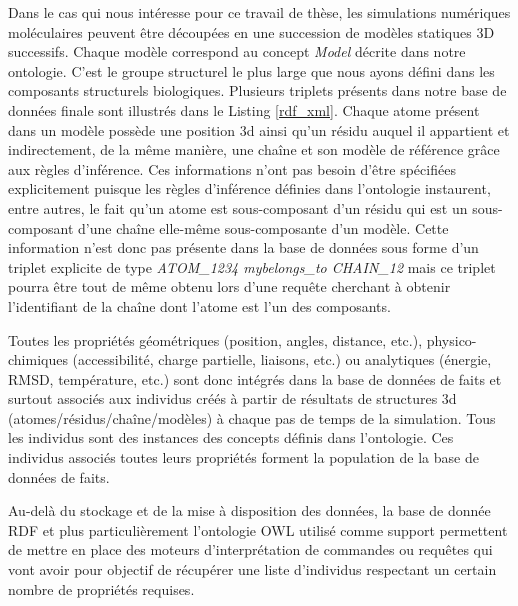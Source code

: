 Dans le cas qui nous intéresse pour ce travail de thèse, les simulations numériques moléculaires peuvent être découpées en une succession de modèles statiques 3D successifs. Chaque modèle correspond au concept \textit{Model} décrite dans notre ontologie. C'est le groupe structurel le plus large que nous ayons défini dans les composants structurels biologiques. Plusieurs triplets présents dans notre base de données finale sont illustrés dans le Listing \ref{rdf_xml}. Chaque atome présent dans un modèle possède une position 3d ainsi qu'un résidu auquel il appartient et indirectement, de la même manière, une chaîne et son modèle de référence grâce aux règles d'inférence. Ces informations n'ont pas besoin d'être spécifiées explicitement puisque les règles d'inférence définies dans l'ontologie instaurent, entre autres, le fait qu'un atome est sous-composant d'un résidu qui est un sous-composant d'une chaîne elle-même sous-composante d'un modèle. 
Cette information n'est donc pas présente dans la base de données sous forme d'un triplet explicite de type \textit{ATOM\_1234 my\:belongs\_to CHAIN\_12} mais ce triplet pourra être tout de même obtenu lors d'une requête cherchant à obtenir l'identifiant de la chaîne dont l'atome est l'un des composants. 

Toutes les propriétés géométriques (position, angles, distance, etc.), physico-chimiques (accessibilité, charge partielle, liaisons, etc.) ou analytiques (énergie, RMSD, température, etc.)  sont donc intégrés dans la base de données de faits et surtout associés aux individus créés à partir de résultats de structures 3d  (atomes/résidus/chaîne/modèles) à chaque pas de temps de la simulation. Tous les  individus sont des instances des concepts définis dans l'ontologie. Ces individus associés toutes leurs propriétés forment la population de la base de données de faits.

Au-delà du stockage et de la mise à disposition des données, la base de donnée RDF et plus particulièrement l'ontologie OWL utilisé comme support permettent de mettre en place des moteurs d'interprétation de commandes ou requêtes qui vont avoir pour objectif de récupérer une liste d'individus respectant un certain nombre de propriétés requises.

